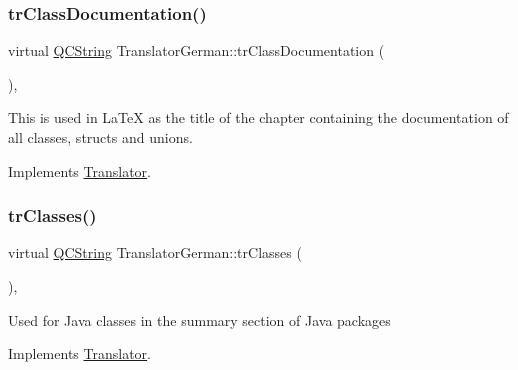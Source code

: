 \mbox{\label{class_translator_german_adfb715d031626079265d0bc58b104197}} 
\subsubsection{\texorpdfstring{trClassDocumentation()}{trClassDocumentation()}}
{\footnotesize\ttfamily virtual \mbox{\hyperlink{class_q_c_string}{Q\+C\+String}} Translator\+German\+::tr\+Class\+Documentation (\begin{DoxyParamCaption}{ }\end{DoxyParamCaption})\hspace{0.3cm}{\ttfamily [inline]}, {\ttfamily [virtual]}}

This is used in La\+TeX as the title of the chapter containing the documentation of all classes, structs and unions. 

Implements \mbox{\hyperlink{class_translator}{Translator}}.

\mbox{\label{class_translator_german_a9de963a8542a41464915a6f11ecab5bc}} 
\subsubsection{\texorpdfstring{trClasses()}{trClasses()}}
{\footnotesize\ttfamily virtual \mbox{\hyperlink{class_q_c_string}{Q\+C\+String}} Translator\+German\+::tr\+Classes (\begin{DoxyParamCaption}{ }\end{DoxyParamCaption})\hspace{0.3cm}{\ttfamily [inline]}, {\ttfamily [virtual]}}

Used for Java classes in the summary section of Java packages 

Implements \mbox{\hyperlink{class_translator}{Translator}}.

\mbox{\label{class_translator_german_af55fa2ba925501a2bffc5b28e080af85}} 
